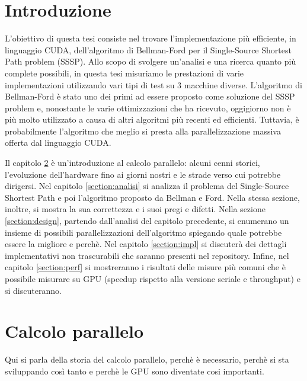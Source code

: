 \documentclass[a4paper]{article}
\begin{document}
	\listofalgorithms
	\newpage
	
	\section{Introduzione}
	L'obiettivo di questa tesi consiste nel trovare l'implementazione più efficiente, in linguaggio CUDA, dell'algoritmo di Bellman-Ford per il Single-Source Shortest Path problem (SSSP). Allo scopo di svolgere un'analisi e una ricerca quanto più complete possibili, in questa tesi misuriamo le prestazioni di varie implementazioni utilizzando vari tipi di test su 3 macchine diverse. L'algoritmo di Bellman-Ford è stato uno dei primi ad essere proposto come soluzione del SSSP problem e, nonostante le varie ottimizzazioni che ha ricevuto, oggigiorno non è più molto utilizzato a causa di altri algoritmi più recenti ed efficienti. Tuttavia, è probabilmente l'algoritmo che meglio si presta alla parallelizzazione massiva offerta dal linguaggio CUDA.
	
	Il capitolo \ref{section:storia} è un'introduzione al calcolo parallelo: alcuni cenni storici, l'evoluzione dell'hardware fino ai giorni nostri e le strade verso cui potrebbe dirigersi. Nel capitolo \ref{section:analisi} si analizza il problema del Single-Source Shortest Path e poi l'algoritmo proposto da Bellman e Ford. Nella stessa sezione, inoltre, si mostra la sua correttezza e i suoi pregi e difetti. Nella sezione \ref{section:design}, partendo dall'analisi del capitolo precedente, si enumerano un insieme di possibili parallelizzazioni dell'algoritmo spiegando quale potrebbe essere la migliore e perchè. Nel capitolo \ref{section:impl} si discuterà dei dettagli implementativi non trascurabili che saranno presenti nel repository. Infine, nel capitolo \ref{section:perf} si mostreranno i risultati delle misure più comuni che è possibile misurare su GPU (speedup rispetto alla versione seriale e throughput) e si discuteranno.
	
	\section{Calcolo parallelo}
	\label{section:storia}
	Qui si parla della storia del calcolo parallelo, perchè è necessario, perchè si sta sviluppando così tanto e perchè le GPU sono diventate cosi importanti.
	
\end{document}
